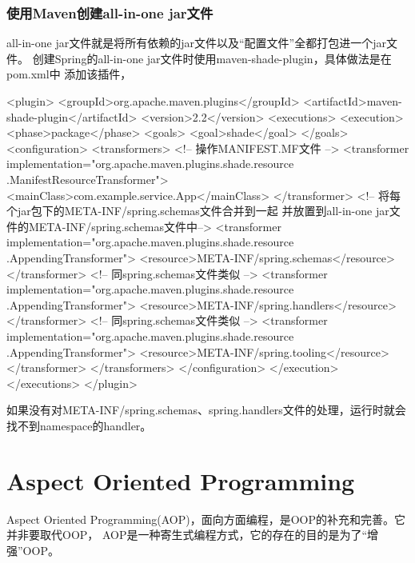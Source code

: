 \documentclass[a4paper,11pt]{article}
\begin{document}
\section[使用Maven创建all-in-one jar文件]{使用Maven创建all-in-one jar文件}
all-in-one jar文件就是将所有依赖的jar文件以及“配置文件”全都打包进一个jar文件。
创建Spring的all-in-one jar文件时使用maven-shade-plugin，具体做法是在pom.xml中
添加该插件，

\begin{xmlcode}
<plugin>
  <groupId>org.apache.maven.plugins</groupId>
  <artifactId>maven-shade-plugin</artifactId>
  <version>2.2</version>
  <executions>
    <execution>
      <phase>package</phase>
      <goals>
        <goal>shade</goal>
      </goals>
      <configuration>
        <transformers>
          <!-- 操作MANIFEST.MF文件 -->
          <transformer
            implementation="org.apache.maven.plugins.shade.resource
                                            .ManifestResourceTransformer">
            <mainClass>com.example.service.App</mainClass>
          </transformer>
          <!-- 将每个jar包下的META-INF/spring.schemas文件合并到一起
               并放置到all-in-one jar文件的META-INF/spring.schemas文件中-->
          <transformer
            implementation="org.apache.maven.plugins.shade.resource
                                            .AppendingTransformer">
            <resource>META-INF/spring.schemas</resource>
          </transformer>
          <!-- 同spring.schemas文件类似 -->
          <transformer
            implementation="org.apache.maven.plugins.shade.resource
                                            .AppendingTransformer">
            <resource>META-INF/spring.handlers</resource>
          </transformer>
          <!-- 同spring.schemas文件类似 -->
          <transformer
            implementation="org.apache.maven.plugins.shade.resource
                                            .AppendingTransformer">
            <resource>META-INF/spring.tooling</resource>
          </transformer>
        </transformers>
      </configuration>
    </execution>
  </executions>
</plugin>
\end{xmlcode}

如果没有对META-INF/spring.schemas、spring.handlers文件的处理，运行时就会
找不到namespace的handler。


\part[Aspect Oriented Programming]{Aspect Oriented Programming}
Aspect Oriented Programming(AOP)，面向方面编程，是OOP的补充和完善。它并非要取代OOP，
AOP是一种寄生式编程方式，它的存在的目的是为了“增强”OOP。
\end{document}
